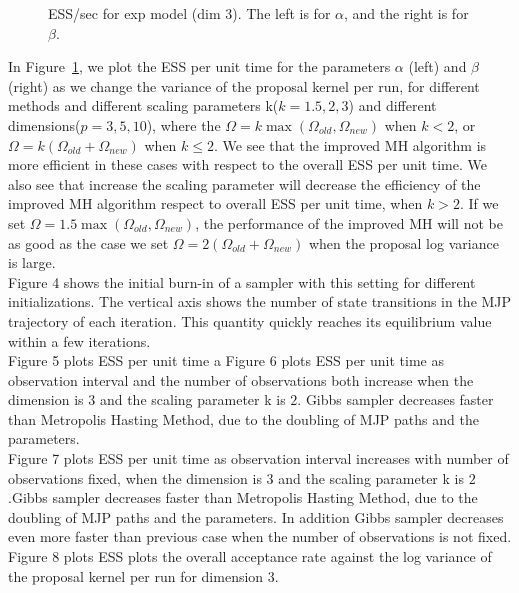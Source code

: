\begin{figure}
\begin{minipage}[hp]{0.45\linewidth}
    \vspace{-0 in}
  \end{minipage}
    \caption{ESS/sec for exp model (dim 3). The left is for $\alpha$, and the right is for $\beta$.}
     \label{fig:ESS_EXP_D3}
  \end{figure}
  In Figure~\ref{fig:ESS_EXP_D3}, we plot the ESS per unit time for the parameters $\alpha$ (left) and $\beta$ (right) as we change the variance of the
  proposal kernel per run, for different methods and different scaling parameters k($k = 1.5, 2, 3$) and different dimensions($p = 3, 5, 10$), where the  $\Omega = k \max(\Omega_{old}, \Omega_{new})$ when $k < 2$, or $\Omega = k (\Omega_{old} + \Omega_{new})$ when $k \leq 2$. We see that the improved MH algorithm is more efficient in these cases with respect to the overall ESS per unit time. We also see that increase the scaling parameter will decrease the efficiency of the improved MH algorithm respect to overall ESS per unit time, when $k > 2$. If we set $\Omega = 1.5 \max(\Omega_{old}, \Omega_{new})$, the performance of the improved MH will not be as good as the case we set $\Omega = 2(\Omega_{old} + \Omega_{new})$ when the proposal log variance is large.\\
Figure 4 shows the initial burn-in of a sampler with this setting for different initializations. The vertical axis shows the number of state transitions in the MJP trajectory of each iteration. This quantity quickly reaches its equilibrium value within a few iterations.\\

Figure 5 plots ESS per unit time a
Figure 6 plots ESS per unit time as observation interval and the number of observations both increase when the dimension is $3$ and the scaling parameter k is $2$. Gibbs sampler decreases faster than Metropolis Hasting Method, due to the doubling of MJP paths and the parameters. \\

Figure 7 plots ESS per unit time as observation interval increases with number of observations fixed, when the dimension is $3$ and the scaling parameter k is $2$.Gibbs sampler decreases faster than Metropolis Hasting Method, due to the doubling of MJP paths and the parameters. In addition Gibbs sampler decreases even more faster than previous case when the number of observations is not fixed. \\

Figure 8 plots ESS plots the overall  acceptance rate against the log variance of the proposal kernel per run for dimension $3$. 


